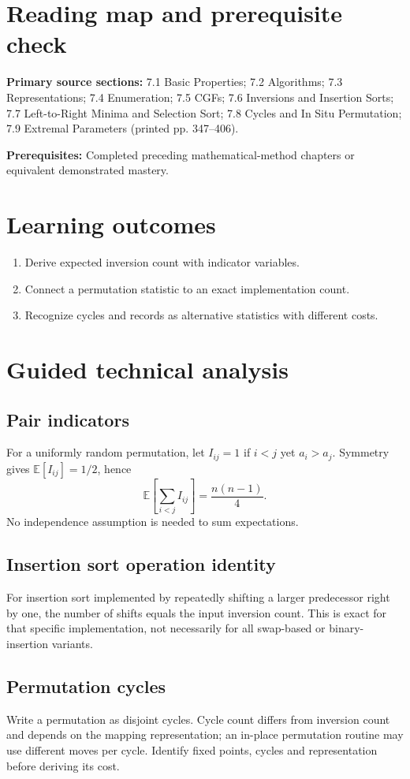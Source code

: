 \documentclass[11pt]{article}
\providecommand{\Expect}{\mathbb{E}}
\begin{document}
\makedoctocpage
\section{Reading map and prerequisite check}
\noindent\textbf{Primary source sections:} 7.1 Basic Properties; 7.2 Algorithms; 7.3 Representations; 7.4 Enumeration; 7.5 CGFs; 7.6 Inversions and Insertion Sorts; 7.7 Left-to-Right Minima and Selection Sort; 7.8 Cycles and In Situ Permutation; 7.9 Extremal Parameters (printed pp. 347--406).\par
\noindent\textbf{Prerequisites:} Completed preceding mathematical-method chapters or equivalent demonstrated mastery.\par
\section{Learning outcomes}
\begin{enumerate}
\item Derive expected inversion count with indicator variables.
\item Connect a permutation statistic to an exact implementation count.
\item Recognize cycles and records as alternative statistics with different costs.
\end{enumerate}
\section{Guided technical analysis}
\subsection{Pair indicators}
For a uniformly random permutation, let $I_{ij}=1$ if $i<j$ yet $a_i>a_j$. Symmetry gives $\Expect[I_{ij}]=1/2$, hence
\[
\Expect\!\left[\sum_{i<j}I_{ij}\right]=\frac{n(n-1)}{4}.
\]
No independence assumption is needed to sum expectations.
\subsection{Insertion sort operation identity}
For insertion sort implemented by repeatedly shifting a larger predecessor right by one, the number of shifts equals the input inversion count. This is exact for that specific implementation, not necessarily for all swap-based or binary-insertion variants.
\subsection{Permutation cycles}
Write a permutation as disjoint cycles. Cycle count differs from inversion count and depends on the mapping representation; an in-place permutation routine may use different moves per cycle. Identify fixed points, cycles and representation before deriving its cost.
\end{document}
